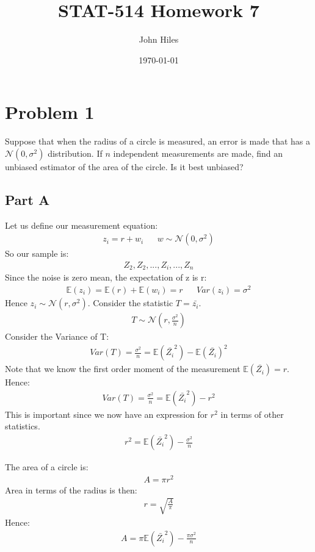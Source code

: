 \documentclass{article}
\title{STAT-514 Homework 7}
\author{John Hiles}
\date\today
\begin{document}
\maketitle %

\section*{Problem 1}
Suppose that when the radius of a circle is measured, an error is made that has a $\mathcal{N}(0,\sigma^2)$ distribution. If $n$ independent measurements are made, find an unbiased estimator of the area of the circle. Is it best unbiased?
\subsection*{Part A}
Let us define our measurement equation:
\begin{align*}
z_i = r + w_i && w \sim \mathcal{N}(0,\sigma^2)
\end{align*}
So our sample is:
\begin{align*}
Z_2,Z_2,...,Z_i,...,Z_n
\end{align*}
Since the noise is zero mean, the expectation of z is r:
\begin{align*}
\mathbb{E}(z_i) = \mathbb{E}(r) + \mathbb{E}(w_i) = r && Var(z_i) = \sigma^2
\end{align*}
Hence $z_i \sim \mathcal{N}(r,\sigma^2)$. Consider the statistic $T=\bar{z_i}$.
\begin{align*}
T \sim \mathcal{N}(r,\frac{\sigma^2}{n})
\end{align*}
Consider the Variance of T:
\begin{align*}
Var(T) = \frac{\sigma^2}{n} = \mathbb{E}(\bar{Z_i}^2) - \mathbb{E}(\bar{Z_i})^2
\end{align*}
Note that we know the first order moment of the measurement $\mathbb{E}(\bar{Z_i}) = r$. Hence:
\begin{align*}
Var(T) = \frac{\sigma^2}{n} = \mathbb{E}(\bar{Z_i}^2) - r^2
\end{align*}
This is important since we now have an expression for $r^2$ in terms of other statistics.
\begin{align*}
r^2 = \mathbb{E}(\bar{Z_i}^2) - \frac{\sigma^2}{n}
\end{align*}

The area of a circle is:
\begin{align*}
A = \pi r^2 
\end{align*}
Area in terms of the radius is then:
\begin{align*}
r = \sqrt{\frac{A}{\pi}}
\end{align*}
Hence:
\begin{align*}
A = \pi \mathbb{E}(\bar{Z_i}^2) - \frac{\pi \sigma^2}{n}
\end{align*}
\end{document}
